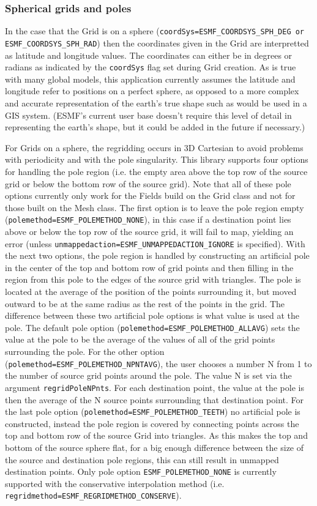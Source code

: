 \subsubsection{Spherical grids and poles}
In the case that the Grid is on a sphere ({\tt coordSys=ESMF\_COORDSYS\_SPH\_DEG or ESMF\_COORDSYS\_SPH\_RAD})
then the coordinates given in the Grid are interpretted as latitude and longitude values. The coordinates can either be in degrees or radians as indicated by the 
{\tt coordSys} flag set during Grid creation. As is true with many global models, this application currently assumes the latitude and longitude refer to positions on a 
perfect sphere, as opposed to a more complex and accurate representation of the earth's true shape such as would be used in a GIS system. (ESMF's current user base doesn't 
require this level of detail in representing the earth's shape, but it could be added in the future if necessary.)

For Grids on a sphere, the regridding occurs in 3D Cartesian to avoid
problems with periodicity and with the pole singularity. This library
 supports four options for handling the pole region (i.e. the empty area above the top row of the source grid or below
 the bottom row of the source grid).  Note that all of these pole options currently only work for the Fields build on the Grid class and not for those built on 
 the Mesh class. The first option is to leave the pole region empty ({\tt polemethod=ESMF\_POLEMETHOD\_NONE}), in this 
 case if a destination point lies above or below the 
 top row of the source grid, it will fail to map, yielding an error (unless {\tt unmappedaction=ESMF\_UNMAPPEDACTION\_IGNORE} is specified).  
 With the next two options, the pole region is handled by constructing 
 an artificial pole in the center of the top and bottom row of grid points and then filling
 in the region from this pole to the edges of the source grid with triangles. 
 The pole is located at the average of the position of the points surrounding
 it, but moved outward to be at the same radius as the rest of the points
 in the grid. The difference between these two artificial pole options is what value is used at the pole. 
 The default pole option ({\tt polemethod=ESMF\_POLEMETHOD\_ALLAVG}) sets the value at the pole to be the average of the values
 of all of the grid points surrounding the pole. For the other option ({\tt polemethod=ESMF\_POLEMETHOD\_NPNTAVG}), the user chooses
 a number N from 1 to the number of source grid points around the pole. The value N is set via the argument {\tt regridPoleNPnts}. For
 each destination point, the value at the pole is then the average of the N source points
 surrounding that destination point. For the last pole option ({\tt polemethod=ESMF\_POLEMETHOD\_TEETH}) no artificial pole is constructed, instead the
 pole region is covered by connecting points across the top and bottom row of the source Grid into triangles. As 
 this makes the top and bottom of the source sphere flat, for a big enough difference between the size of
 the source and destination pole regions, this can still result in unmapped destination points.  
 Only pole option {\tt ESMF\_POLEMETHOD\_NONE} is currently supported with the conservative interpolation method 
(i.e. {\tt regridmethod=ESMF\_REGRIDMETHOD\_CONSERVE}). 

